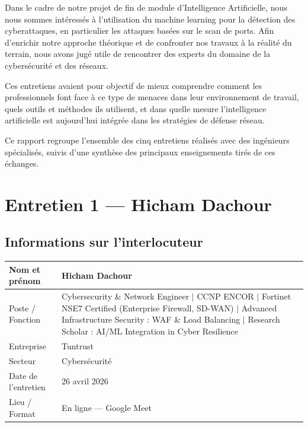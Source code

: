 \documentclass[12pt,a4paper]{article}
\begin{document}
Dans le cadre de notre projet de fin de module d'Intelligence Artificielle, nous nous sommes
int\'{e}ress\'{e}s \`{a} l'utilisation du machine learning pour la d\'{e}tection des cyberattaques, en
particulier les attaques bas\'{e}es sur le scan de ports. Afin d'enrichir notre approche th\'{e}orique
et de confronter nos travaux \`{a} la r\'{e}alit\'{e} du terrain, nous avons jug\'{e} utile de rencontrer des
experts du domaine de la cybers\'{e}curit\'{e} et des r\'{e}seaux.

Ces entretiens avaient pour objectif de mieux comprendre comment les professionnels font
face \`{a} ce type de menaces dans leur environnement de travail, quels outils et m\'{e}thodes ils
utilisent, et dans quelle mesure l'intelligence artificielle est aujourd'hui int\'{e}gr\'{e}e dans les
strat\'{e}gies de d\'{e}fense r\'{e}seau.

Ce rapport regroupe l'ensemble des cinq entretiens r\'{e}alis\'{e}s avec des ing\'{e}nieurs sp\'{e}cialis\'{e}s,
suivis d'une synth\`{e}se des principaux enseignements tir\'{e}s de ces \'{e}changes.

\clearpage

\section{Entretien 1 --- Hicham Dachour}

\subsection*{Informations sur l'interlocuteur}

\begin{tabular}{@{}B{4cm} L{10.5cm}@{}}
  \hline
  Nom et pr\'{e}nom      & Hicham Dachour \\
  \hline
  Poste / Fonction   & Cybersecurity \& Network Engineer $|$ CCNP ENCOR $|$ Fortinet NSE7
                       Certified (Enterprise Firewall, SD-WAN) $|$ Advanced Infrastructure
                       Security : WAF \& Load Balancing $|$ Research Scholar : AI/ML
                       Integration in Cyber Resilience \\
  \hline
  Entreprise         & Tuntrust \\
  \hline
  Secteur            & Cybers\'{e}curit\'{e} \\
  \hline
  Date de l'entretien & 26 avril 2026 \\
  \hline
  Lieu / Format      & En ligne --- Google Meet \\
  \hline
\end{tabular}
\end{document}
